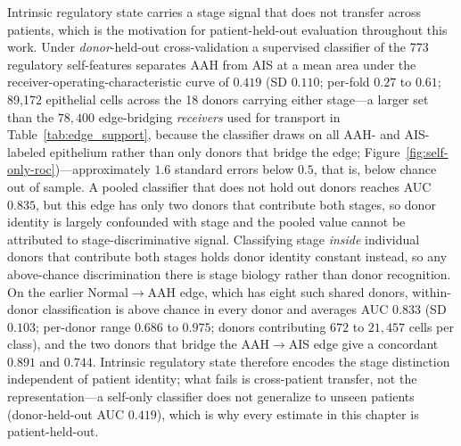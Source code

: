 Intrinsic regulatory state carries a stage signal that does not transfer across patients, which is the motivation for patient-held-out evaluation throughout this work. Under \emph{donor}-held-out cross-validation a supervised classifier of the 773 regulatory self-features separates AAH from AIS at a mean area under the receiver-operating-characteristic curve of $0.419$ (SD $0.110$; per-fold $0.27$ to $0.61$; 89{,}172 epithelial cells across the 18 donors carrying either stage---a larger set than the $78{,}400$ edge-bridging \emph{receivers} used for transport in Table~\ref{tab:edge_support}, because the classifier draws on all AAH- and AIS-labeled epithelium rather than only donors that bridge the edge; Figure~\ref{fig:self-only-roc})---approximately $1.6$ standard errors below $0.5$, that is, below chance out of sample. A pooled classifier that does not hold out donors reaches AUC $0.835$, but this edge has only two donors that contribute both stages, so donor identity is largely confounded with stage and the pooled value cannot be attributed to stage-discriminative signal. Classifying stage \emph{inside} individual donors that contribute both stages holds donor identity constant instead, so any above-chance discrimination there is stage biology rather than donor recognition. On the earlier Normal$\rightarrow$AAH edge, which has eight such shared donors, within-donor classification is above chance in every donor and averages AUC $0.833$ (SD $0.103$; per-donor range $0.686$ to $0.975$; donors contributing $672$ to $21{,}457$ cells per class), and the two donors that bridge the AAH$\rightarrow$AIS edge give a concordant $0.891$ and $0.744$. Intrinsic regulatory state therefore encodes the stage distinction independent of patient identity; what fails is cross-patient transfer, not the representation---a self-only classifier does not generalize to unseen patients (donor-held-out AUC $0.419$), which is why every estimate in this chapter is patient-held-out.

